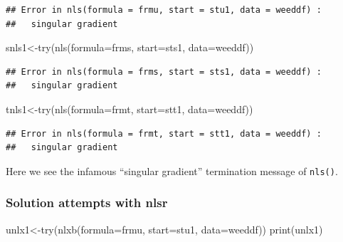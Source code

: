 \documentclass[
]{article}
\newenvironment{Shaded}{\begin{snugshade}}{\end{snugshade}}
\newcommand{\AttributeTok}[1]{\textcolor[rgb]{0.77,0.63,0.00}{#1}}
\newcommand{\FunctionTok}[1]{\textcolor[rgb]{0.00,0.00,0.00}{#1}}
\newcommand{\NormalTok}[1]{#1}
\newcommand{\OtherTok}[1]{\textcolor[rgb]{0.56,0.35,0.01}{#1}}
\begin{document}
\begin{verbatim}
## Error in nls(formula = frmu, start = stu1, data = weeddf) : 
##   singular gradient
\end{verbatim}

\begin{Shaded}
\begin{Highlighting}[]
\NormalTok{snls1}\OtherTok{\textless{}{-}}\FunctionTok{try}\NormalTok{(}\FunctionTok{nls}\NormalTok{(}\AttributeTok{formula=}\NormalTok{frms, }\AttributeTok{start=}\NormalTok{sts1, }\AttributeTok{data=}\NormalTok{weeddf))}
\end{Highlighting}
\end{Shaded}

\begin{verbatim}
## Error in nls(formula = frms, start = sts1, data = weeddf) : 
##   singular gradient
\end{verbatim}

\begin{Shaded}
\begin{Highlighting}[]
\NormalTok{tnls1}\OtherTok{\textless{}{-}}\FunctionTok{try}\NormalTok{(}\FunctionTok{nls}\NormalTok{(}\AttributeTok{formula=}\NormalTok{frmt, }\AttributeTok{start=}\NormalTok{stt1, }\AttributeTok{data=}\NormalTok{weeddf))}
\end{Highlighting}
\end{Shaded}

\begin{verbatim}
## Error in nls(formula = frmt, start = stt1, data = weeddf) : 
##   singular gradient
\end{verbatim}

Here we see the infamous ``singular gradient'' termination message of
\texttt{nls()}.

\hypertarget{solution-attempts-with-nlsr}{%
\subsubsection{Solution attempts with
nlsr}\label{solution-attempts-with-nlsr}}

\begin{Shaded}
\begin{Highlighting}[]
\NormalTok{unlx1}\OtherTok{\textless{}{-}}\FunctionTok{try}\NormalTok{(}\FunctionTok{nlxb}\NormalTok{(}\AttributeTok{formula=}\NormalTok{frmu, }\AttributeTok{start=}\NormalTok{stu1, }\AttributeTok{data=}\NormalTok{weeddf))}
\FunctionTok{print}\NormalTok{(unlx1) }
\end{Highlighting}
\end{Shaded}
\end{document}
